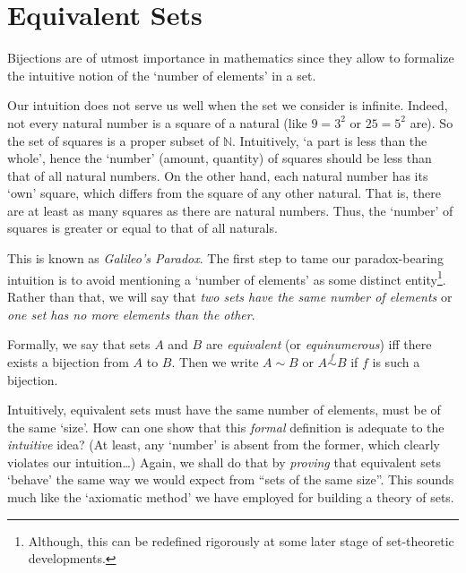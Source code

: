 \documentclass[12pt,notitlepage]{article}
\theoremstyle{plain}
\theoremstyle{definition}
\theoremstyle{plain}
\newcommand{\N}{\mathbb{N}}
\newcommand{\1}{\mathbf{1}}
\newcommand{\0}{\mathbf{0}}
\newcommand{\mcomm}[1]{}
\begin{document}
\section{Equivalent Sets}
\mcomm{The main goal of this section is to define set equivalence and embedding formally. The Instructor should try to persuade the students that these notions are natural models for comparing sets by their `sizes'. Here we present some basic facts (including Cantor---Schr\"{o}der---Bernstein Theorem) applicable to both the finite and infinite cases.}

Bijections are of utmost importance in mathematics since they allow to formalize the intuitive notion of the `number of elements' in a set.

Our intuition does not serve us well when the set we consider is infinite. Indeed, not every natural number is a square of a natural (like $9 = 3^2$ or $25 = 5^2$ are). So the set of squares is a proper subset of $\N$. Intuitively, `a part is less than the whole', hence the `number' (amount, quantity) of squares should be less than that of all natural numbers. On the other hand, each natural number has its `own' square, which differs from the square of any other natural. That is, there are at least as many squares as there are natural numbers. Thus, the `number' of squares is greater or equal to that of all naturals.

This is known as \emph{Galileo's Paradox}. The first step to tame our paradox-bearing intuition is to avoid  mentioning a `number of elements' as some distinct entity\footnote{Although, this can be redefined rigorously at some later stage of set-theoretic developments.}. Rather than that, we will say that \emph{two sets have the same number of elements} or \emph{one set has no more elements than the other}.

Formally, we say that sets $A$ and $B$ are \emph{equivalent} (or \emph{equinumerous}) iff there exists a bijection from $A$ to $B$. Then we write $A \sim B$ or $A \stackrel{f}{\sim} B$ if $f$ is such a bijection.

Intuitively, equivalent sets must have the same number of elements, must be of the same `size'. How can one show that this \emph{formal} definition is adequate to the \emph{intuitive} idea? (At least, any `number' is absent from the former, which clearly violates our intuition\dots) Again, we shall do that by \emph{proving} that equivalent sets `behave' the same way we would expect from ``sets of the same size''. This sounds much like the `axiomatic method' we have employed for building a theory of sets.
\end{document}
